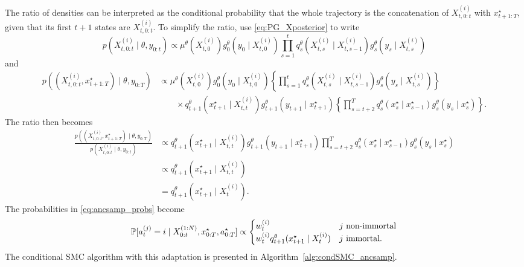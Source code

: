 The ratio of densities can be interpreted as the conditional probability that the whole trajectory is the concatenation of $X_{t,0:t}^{(i)}$ with $x_{t+1:T}^\star$, given that its first $t+1$ states are $X_{t,0:t}^{(i)}$.
To simplify the ratio, use \eqref{eq:PG_Xposterior} to write
\begin{equation*}
p( X_{t,0:t}^{(i)} \mid \theta, y_{0:t} )
\propto \mu^\theta( X_{t,0}^{(i)} ) g_0^\theta( y_0 \mid X_{t,0}^{(i)} ) 
        \prod_{s=1}^{t} q_s^\theta( X_{t,s}^{(i)} \mid X_{t,s-1}^{(i)} ) 
        g_s^\theta( y_s \mid X_{t,s}^{(i)} )
\end{equation*}
and %
\begin{align*}
p( (X_{t,0:t}^{(i)}, x_{t+1:T}^\star) \mid \theta, y_{0:T} )
&\propto \mu^\theta( X_{t,0}^{(i)} ) g_0^\theta( y_0 \mid X_{t,0}^{(i)} ) 
        \left\{ \prod_{s=1}^{t} q_s^\theta( X_{t,s}^{(i)} \mid X_{t,s-1}^{(i)} )
        g_s^\theta( y_s \mid X_{t,s}^{(i)} ) \right\} \\
    &\qquad\times q_{t+1}^\theta( x_{t+1}^\star \mid X_{t,t}^{(i)} ) 
        g_{t+1}^\theta( y_{t+1} \mid x_{t+1}^\star )
        \left\{ \prod_{s=t+2}^T q_s^\theta(x_s^\star \mid x_{s-1}^\star)
        g_s^\theta(y_s \mid x_s^\star) \right\} .
\end{align*}
The ratio then becomes
\begin{align*}
\frac{p( ( X_{t,0:t}^{(i)}, x_{t+1:T}^\star ) \mid \theta, y_{0:T} )}
        {p( X_{t,0:t}^{(i)} \mid \theta, y_{0:t} ) }
&\propto q_{t+1}^\theta( x_{t+1}^\star \mid X_{t,t}^{(i)} ) 
        g_{t+1}^\theta( y_{t+1} \mid x_{t+1}^\star ) 
        \prod_{s=t+2}^T q_s^\theta( x_s^\star \mid x_{s-1}^\star ) 
        g_s^\theta( y_s \mid x_s^\star ) \\
&\propto q_{t+1}^\theta( x_{t+1}^\star \mid X_{t,t}^{(i)} ) \\
&= q_{t+1}^\theta( x_{t+1}^\star \mid X_{t}^{(i)} )  .
\end{align*}
The probabilities in \eqref{eq:ancsamp_probs} become
\begin{equation}\label{eq:ancsamp_probs_simplified}
\mathbb{P}[a_t^{(j)} = i \mid X_{0:t}^{(1:N)}, x_{0:T}^\star, a_{0:T}^\star ] 
\propto \begin{cases}
w_t^{(i)} & j \text{ non-immortal}\\
w_t^{(i)} q_{t+1}^\theta( x_{t+1}^\star \mid X_{t}^{(i)} ) & j \text{ immortal} .
\end{cases}
\end{equation}
The conditional SMC algorithm with this adaptation is presented in Algorithm~\ref{alg:condSMC_ancsamp}.


